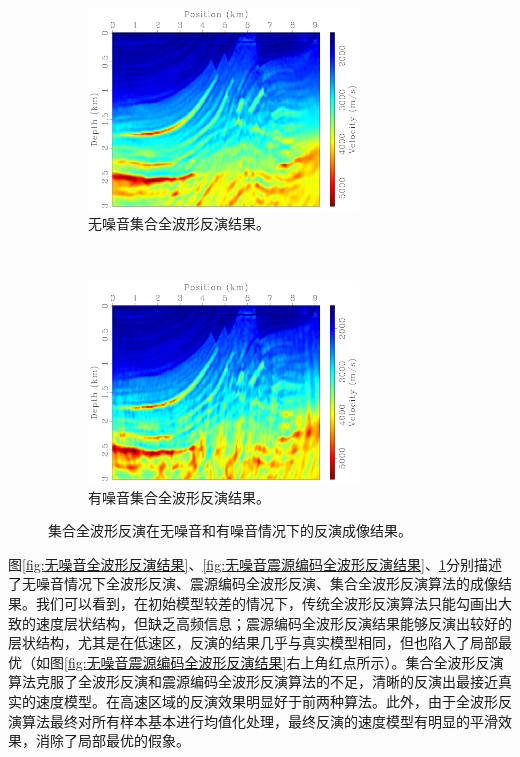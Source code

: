\documentclass[degree=doctor]{thuthesis}
\begin{document}
\begin{figure}[ht]
    \begin{subfigure}[b]{0.5\textwidth}
        \centering
        \includegraphics[height=2.1in]{enfwi.pdf}
        \caption{无噪音集合全波形反演结果。}
        \label{fig:无噪音集合全波形反演结果}
    \end{subfigure}%
    ~
    \begin{subfigure}[b]{0.5\textwidth}
        \centering
        \includegraphics[height=2.1in]{enfwi-noise.pdf}
        \caption{有噪音集合全波形反演结果。}
        \label{fig:有噪音集合全波形反演结果}
    \end{subfigure}
    \caption{集合全波形反演在无噪音和有噪音情况下的反演成像结果。}
\end{figure}

图\ref{fig:无噪音全波形反演结果}、\ref{fig:无噪音震源编码全波形反演结果}、\ref{fig:无噪音集合全波形反演结果}分别描述了无噪音情况下全波形反演、震源编码全波形反演、集合全波形反演算法的成像结果。我们可以看到，在初始模型较差的情况下，传统全波形反演算法只能勾画出大致的速度层状结构，但缺乏高频信息；震源编码全波形反演结果能够反演出较好的层状结构，尤其是在低速区，反演的结果几乎与真实模型相同，但也陷入了局部最优（如图\ref{fig:无噪音震源编码全波形反演结果}右上角红点所示）。集合全波形反演算法克服了全波形反演和震源编码全波形反演算法的不足，清晰的反演出最接近真实的速度模型。在高速区域的反演效果明显好于前两种算法。此外，由于全波形反演算法最终对所有样本基本进行均值化处理，最终反演的速度模型有明显的平滑效果，消除了局部最优的假象。
\end{document}
